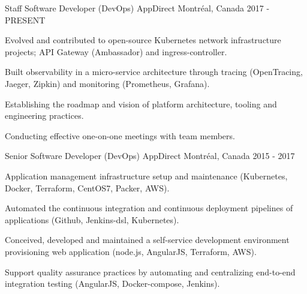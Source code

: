 
\begin{cventries}

  \cventry
    {Staff Software Developer (DevOps)} %
    {AppDirect} %
    {Montréal, Canada} %
    {2017 - PRESENT} %
    {
      \begin{cvitems} %
        \item {Evolved and contributed to open-source Kubernetes network infrastructure projects; API Gateway (Ambassador) and ingress-controller.}
        \item {Built observability in a micro-service architecture through tracing (OpenTracing, Jaeger, Zipkin) and monitoring (Prometheus, Grafana).}
        \item {Establishing the roadmap and vision of platform architecture, tooling and engineering practices.}
        \item {Conducting effective one-on-one meetings with team members.}
      \end{cvitems}
    }

  \cventry
    {Senior Software Developer (DevOps)} %
    {AppDirect} %
    {Montréal, Canada} %
    {2015 - 2017} %
    {
      \begin{cvitems} %
        \item {Application management infrastructure setup and maintenance (Kubernetes, Docker, Terraform, CentOS7, Packer, AWS).}
        \item {Automated the continuous integration and continuous deployment pipelines of applications (Github, Jenkins-dsl, Kubernetes).}
        \item {Conceived, developed and maintained a self-service development environment provisioning web application (node.js, AngularJS, Terraform, AWS).}
        \item {Support quality assurance practices by automating and centralizing end-to-end integration testing (AngularJS, Docker-compose, Jenkins).}
      \end{cvitems}
    }


\end{cventries}
